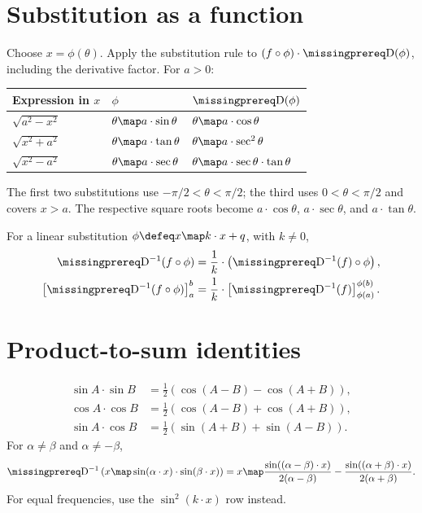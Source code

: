 \documentclass[10pt]{article}
\begin{document}
\clearpage
\section*{Substitution as a function}
Choose $x=\phi(\theta)$. Apply the substitution rule to
$(f\circ\phi)\cdot\DiffOp(\phi)$, including the derivative factor.
For $a>0$:

\begin{tabularx}{\textwidth}{|Y|Y|Y|}
\hline
Expression in $x$ & $\phi$ & $\DiffOp(\phi)$ \\ \hline
$\sqrt{a^2-x^2}$ & $\theta\map a\cdot\sin\theta$ & $\theta\map a\cdot\cos\theta$ \\ \hline
$\sqrt{x^2+a^2}$ & $\theta\map a\cdot\tan\theta$ & $\theta\map a\cdot\sec^2\theta$ \\ \hline
$\sqrt{x^2-a^2}$ & $\theta\map a\cdot\sec\theta$ & $\theta\map a\cdot\sec\theta\cdot\tan\theta$ \\ \hline
\end{tabularx}
The first two substitutions use $-\pi/2<\theta<\pi/2$; the third uses
$0<\theta<\pi/2$ and covers $x>a$. The respective square roots become
$a\cdot\cos\theta$, $a\cdot\sec\theta$, and $a\cdot\tan\theta$.

For a linear substitution $\phi\defeq x\map k\cdot x+q$, with $k\ne0$,
\begin{align*}
  \DiffOp^{-1}(f\circ\phi)
    &=\frac1k\cdot\left(\DiffOp^{-1}(f)\circ\phi\right),\\
  \left[\DiffOp^{-1}(f\circ\phi)\right]_a^b
    &=\frac1k\cdot\left[\DiffOp^{-1}(f)\right]_{\phi(a)}^{\phi(b)}.
\end{align*}

\section*{Product-to-sum identities}
\begin{align*}
  \sin A\cdot\sin B&=\tfrac12\left(\cos(A-B)-\cos(A+B)\right),\\
  \cos A\cdot\cos B&=\tfrac12\left(\cos(A-B)+\cos(A+B)\right),\\
  \sin A\cdot\cos B&=\tfrac12\left(\sin(A+B)+\sin(A-B)\right).
\end{align*}
For $\alpha\ne\beta$ and $\alpha\ne-\beta$,
\[
  \DiffOp^{-1}\left(x\map\sin(\alpha\cdot x)\cdot\sin(\beta\cdot x)\right)
  =x\map\frac{\sin((\alpha-\beta)\cdot x)}{2(\alpha-\beta)}
       -\frac{\sin((\alpha+\beta)\cdot x)}{2(\alpha+\beta)}.
\]
For equal frequencies, use the $\sin^2(k\cdot x)$ row instead.
\end{document}
